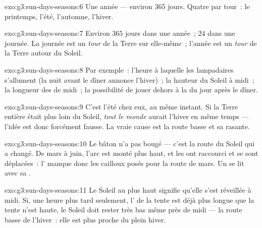 \begin{solution}{exo:g3:sun-days-seasons:6}
Une année --- environ $365$ jours. Quatre  par tour~: le
printemps, l'été, l'automne, l'hiver.
\end{solution}

\begin{solution}{exo:g3:sun-days-seasons:7}
Environ $365$ jours dans une année~; $24$  dans une journée. La
journée est un \emph{tour} de la Terre sur elle-même~; l'année est un
\emph{tour} de la Terre autour du Soleil.
\end{solution}

\begin{solution}{exo:g3:sun-days-seasons:8}
Par exemple~: l'heure à laquelle les lampadaires s'allument (la nuit
avant le dîner annonce l'hiver)~; la hauteur du Soleil à midi~; la
longueur des  de midi~; la possibilité de jouer dehors à la
 du jour après le dîner.
\end{solution}

\begin{solution}{exo:g3:sun-days-seasons:9}
C'est l'été chez eux, au même instant. Si la Terre entière était plus
loin du Soleil, \emph{tout le monde} aurait l'hiver en même temps ---
l'idée est donc forcément fausse. La vraie cause est la route basse
et sa  rasante.
\end{solution}

\begin{solution}{exo:g3:sun-days-seasons:10}
Le bâton n'a pas bougé --- c'est la route du Soleil qui a changé. De
mars à juin, l'arc est monté plus haut, et les  ont raccourci
et se sont déplacées~: l' manque donc les cailloux posés pour la
route de mars. Un  se lit avec sa .
\end{solution}

\begin{solution}{exo:g3:sun-days-seasons:11}
Le Soleil au plus haut signifie qu'elle s'est réveillée à midi. Si,
une heure plus tard seulement, l' de la tente est déjà plus
longue que la tente n'est haute, le Soleil doit rester très bas même
près de midi --- la route basse de l'hiver~: elle est plus proche du
plein hiver.
\end{solution}
